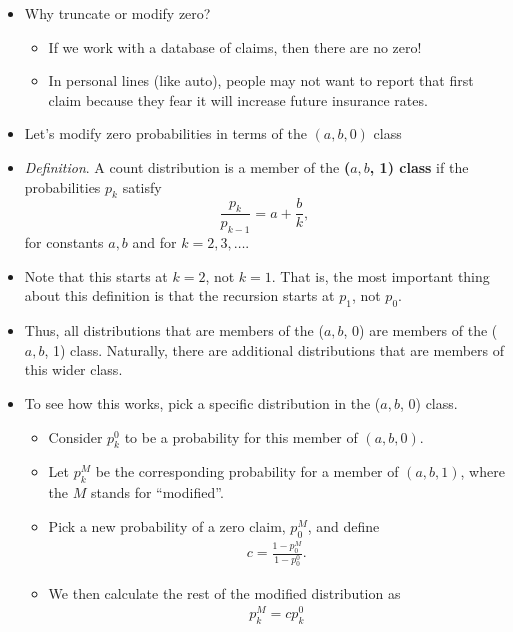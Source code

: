\documentclass[]{book}
\begin{document}
\begin{itemize}
\item
  Why truncate or modify zero?

  \begin{itemize}
  \item
    If we work with a database of claims, then there are no zero!
  \item
    In personal lines (like auto), people may not want to report that
    first claim because they fear it will increase future insurance
    rates.
  \end{itemize}
\item
  Let's modify zero probabilities in terms of the \((a,b,0)\) class
\item
  \emph{Definition}. A count distribution is a member of the
  \textbf{(\(a, b\), 1) class} if the probabilities \(p_k\) satisfy
  \[\frac{p_k}{p_{k-1}}=a+\frac{b}{k},\] for constants \(a,b\) and for
  \(k=2,3, \ldots\).
\item
  Note that this starts at \(k=2\), not \(k=1\). That is, the most
  important thing about this definition is that the recursion starts at
  \(p_1\), not \(p_0\).
\item
  Thus, all distributions that are members of the (\(a, b\), 0) are
  members of the (\(a, b\), 1) class. Naturally, there are additional
  distributions that are members of this wider class.
\item
  To see how this works, pick a specific distribution in the (\(a, b\),
  0) class.

  \begin{itemize}
  \item
    Consider \(p_k^0\) to be a probability for this member of
    \((a,b,0)\).
  \item
    Let \(p_k^M\) be the corresponding probability for a member of
    \((a,b,1)\), where the \(M\) stands for ``modified''.
  \item
    Pick a new probability of a zero claim, \(p_0^M\), and define
    \[\begin{aligned}
    c = \frac{1-p_0^M}{1-p_0^0} .\end{aligned}\]
  \item
    We then calculate the rest of the modified distribution as
    \[\begin{aligned}
    p_k^M =c p_k^0\end{aligned}\]
  \end{itemize}
\end{itemize}
\end{document}
